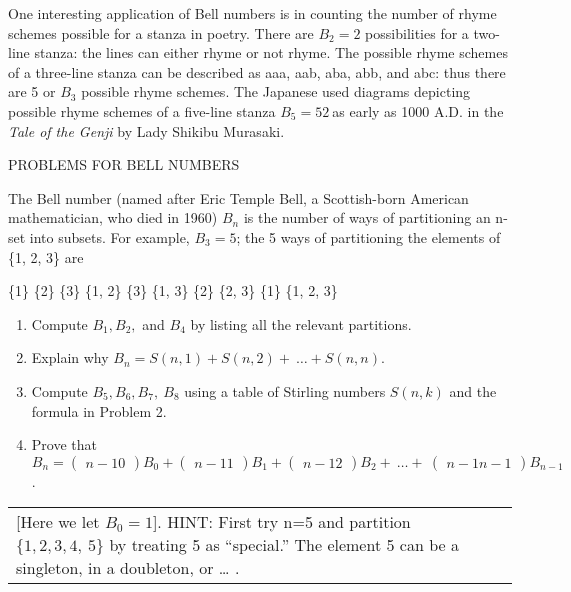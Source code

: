 \documentclass[10pt,letter]{article}
\renewenvironment{quote}
  {\begin{tabular}{|p{13cm}}}
  {\end{tabular}}
\begin{document}
One interesting application of Bell numbers is in counting the number of
rhyme schemes possible for a stanza in poetry. There are \(B_{2} = 2\)
possibilities for a two-line stanza: the lines can either rhyme or not
rhyme. The possible rhyme schemes of a three-line stanza can be
described as aaa, aab, aba, abb, and abc: thus there are 5 or \(B_{3}\)
possible rhyme schemes. The Japanese used diagrams depicting possible
rhyme schemes of a five-line stanza \(B_{5} = 52\ \)as early as 1000
A.D. in the \emph{Tale of the Genji} by Lady Shikibu Murasaki.

PROBLEMS FOR BELL NUMBERS

The Bell number (named after Eric Temple Bell, a Scottish-born American
mathematician, who died in 1960) \(B_{n}\) is the number of ways of
partitioning an n-set into subsets. For example, \(B_{3} = 5\); the 5
ways of partitioning the elements of \{1, 2, 3\} are

\{1\} \{2\} \{3\} \{1, 2\} \{3\} \{1, 3\} \{2\} \{2, 3\} \{1\} \{1, 2,
3\}

\begin{enumerate}
\def\labelenumi{\arabic{enumi}.}

\item
  Compute \(B_{1},B_{2},\) and \(B_{4}\) by listing all the relevant
  partitions.
\item
  Explain why
  \(B_{n} = S\left( n,1 \right) + S\left( n,2 \right) + \ \ldots + S(n,n)\).
\item
  Compute \(B_{5},B_{6},B_{7},\ B_{8}\) using a table of Stirling
  numbers \(S(n,k)\) and the formula in Problem 2.
\item
  Prove that \(B_{n} =

\begin{pmatrix}
  n - 1 
  0 
  \end{pmatrix}
B_{0} +

\begin{pmatrix}
  n - 1 
  1 
  \end{pmatrix}
B_{1} +

\begin{pmatrix}
  n - 1 
  2 
  \end{pmatrix}
B_{2} + \ \ldots + \

\begin{pmatrix}
  n - 1 
  n - 1 
  \end{pmatrix}
B_{n - 1}\).

\end{enumerate}

\begin{quote}
{[}Here we let \(B_{0} = 1\){]}. HINT: First try n=5 and partition
\(\{ 1,2,3,4,\ 5\}\) by treating 5 as ``special.'' The element 5 can be
a singleton, in a doubleton, or \ldots{} .

\end{quote}
\end{document}
